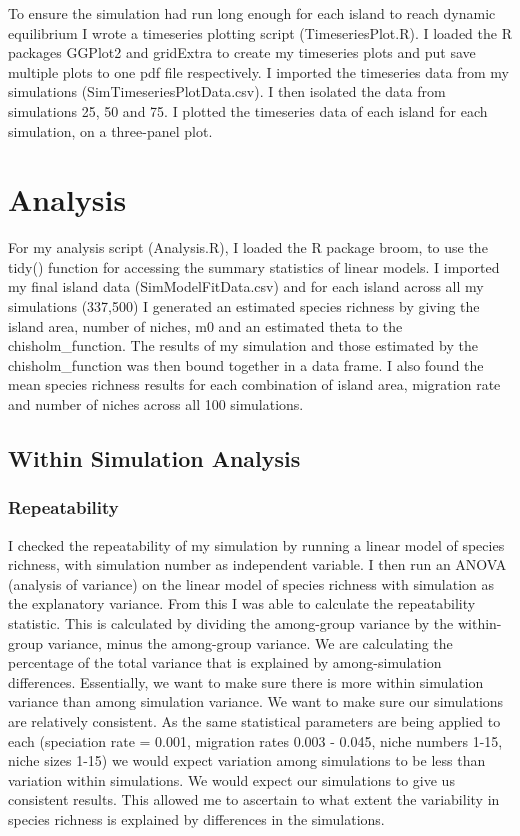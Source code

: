 \documentclass{article}
\begin{document}
To ensure the simulation had run long enough for each island to reach dynamic equilibrium I wrote a timeseries plotting script (TimeseriesPlot.R). I loaded the R packages GGPlot2 and gridExtra to create my timeseries plots and put save multiple plots to one pdf file respectively. I imported the timeseries data from my simulations (SimTimeseriesPlotData.csv). I then isolated the data from simulations 25, 50 and 75. I plotted the timeseries data of each island for each simulation, on a three-panel plot.  

\section{Analysis}
For my analysis script (Analysis.R), I loaded the R package broom, to use the tidy() function for accessing the summary statistics of linear models. I imported my final island data (SimModelFitData.csv) and for each island across all my simulations (337,500) I generated an estimated species richness by giving the island area, number of niches, m0 and an estimated theta to the chisholm\_function. The results of my simulation and those estimated by the chisholm\_function was then bound together in a data frame. I also found the mean species richness results for each combination of island area, migration rate and number of niches across all 100 simulations.
  
\subsection{Within Simulation Analysis}

\subsubsection{Repeatability}
I checked the repeatability of my simulation by running a linear model of species richness, with simulation number as independent variable. I then run an ANOVA (analysis of variance) on the linear model of species richness with simulation as the explanatory variance. From this I was able to calculate the repeatability statistic. This is calculated by dividing the among-group variance by the within-group variance, minus the among-group variance. We are calculating the percentage of the total variance that is explained by among-simulation differences. Essentially, we want to make sure there is more within simulation variance than among simulation variance. We want to make sure our simulations are relatively consistent. As the same statistical parameters are being applied to each (speciation rate = 0.001, migration rates 0.003 - 0.045, niche numbers 1-15, niche sizes 1-15) we would expect variation among simulations to be less than variation within simulations. We would expect our simulations to give us consistent results. This allowed me to ascertain to what extent the variability in species richness is explained by differences in the simulations.
\end{document}
